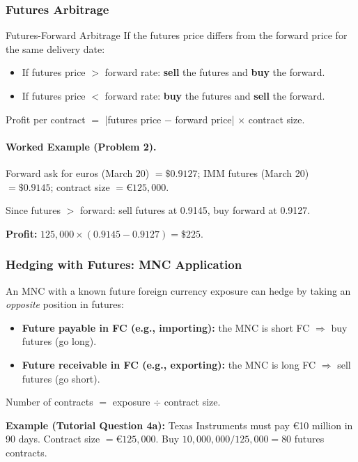 \documentclass[11pt,a4paper]{article}
\begin{document}
\subsubsection{Futures Arbitrage}

\begin{methodbox}{Futures-Forward Arbitrage}
If the futures price differs from the forward price for the same delivery date:
\begin{itemize}
  \item If futures price $>$ forward rate: \textbf{sell} the futures and \textbf{buy} the forward.
  \item If futures price $<$ forward rate: \textbf{buy} the futures and \textbf{sell} the forward.
\end{itemize}
Profit per contract $=$ |futures price $-$ forward price| $\times$ contract size.
\end{methodbox}

\paragraph{Worked Example (Problem 2).}
Forward ask for euros (March 20) $= \$0.9127$; IMM futures (March 20) $= \$0.9145$; contract size $= €125{,}000$.

Since futures $>$ forward: sell futures at 0.9145, buy forward at 0.9127.

\textbf{Profit:} $125{,}000 \times (0.9145 - 0.9127) = \$225$.

\subsubsection{Hedging with Futures: MNC Application}

An MNC with a known future foreign currency exposure can hedge by taking an \textit{opposite} position in futures:
\begin{itemize}
  \item \textbf{Future payable in FC (e.g., importing):} the MNC is short FC $\Rightarrow$ buy futures (go long).
  \item \textbf{Future receivable in FC (e.g., exporting):} the MNC is long FC $\Rightarrow$ sell futures (go short).
\end{itemize}

Number of contracts $=$ exposure $\div$ contract size.

\textbf{Example (Tutorial Question 4a):} Texas Instruments must pay €10 million in 90 days. Contract size $= €125{,}000$. Buy $10{,}000{,}000/125{,}000 = 80$ futures contracts.
\end{document}
